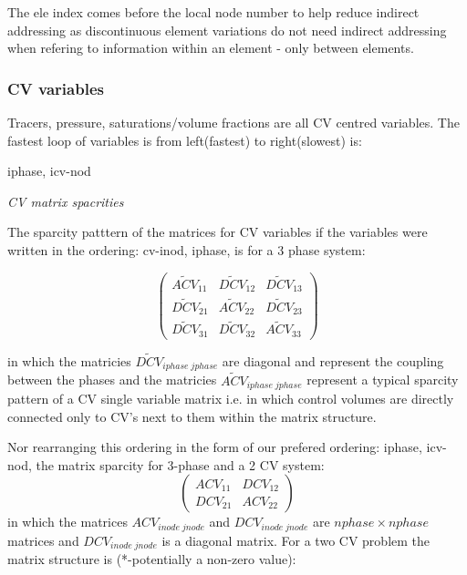 The ele index comes before the local node number to help reduce indirect addressing 
as discontinuous element variations do not need indirect addressing when refering 
to information within an element - only between elements. 

\subsubsection{CV variables} 
Tracers, pressure, saturations/volume fractions are all CV centred variables. 
The fastest loop of variables is from left(fastest) to right(slowest) is: 

\par\noindent
iphase, icv-nod

\par\noindent
{\it CV matrix spacrities} 

The sparcity patttern of the matrices for CV variables if the variables were written 
in the ordering: cv-inod, iphase, is for a 3 phase system: 

\begin{equation}
  \begin{pmatrix}
\widetilde {ACV}_{11}  &  \widetilde {DCV}_{12}  &  \widetilde {DCV}_{13} \\
\widetilde {DCV}_{21}  &  \widetilde {ACV}_{22}  &  \widetilde {DCV}_{23} \\
\widetilde {DCV}_{31}  &  \widetilde {DCV}_{32}  &  \widetilde {ACV}_{33} 
  \end{pmatrix}
\label{CV-mat-spar}
\end{equation}

in which the matricies $\widetilde {DCV}_{iphase\; jphase}$ are diagonal and represent the 
coupling between the phases and the matricies $\widetilde {ACV}_{iphase\; jphase}$ represent 
a typical sparcity pattern of a CV single variable matrix i.e. in which control volumes are 
directly connected only to CV's next to them within the matrix structure. 

Nor rearranging this ordering in the form of our prefered ordering:  iphase, icv-nod, 
the matrix sparcity for 3-phase and a 2 CV system:
\begin{equation}
  \begin{pmatrix}
ACV_{11}  &  DCV_{12}   \\
DCV_{21}  &  ACV_{22} 
  \end{pmatrix}
\label{CV-mat-spar}
\end{equation}
in which the matrices $ACV_{inode\; jnode}$ and $DCV_{inode\; jnode}$ are $nphase \times nphase$ matrices and $DCV_{inode\; jnode}$ 
is a diagonal matrix. 
For 
a two CV problem the matrix structure is (*-potentially a non-zero value): 

